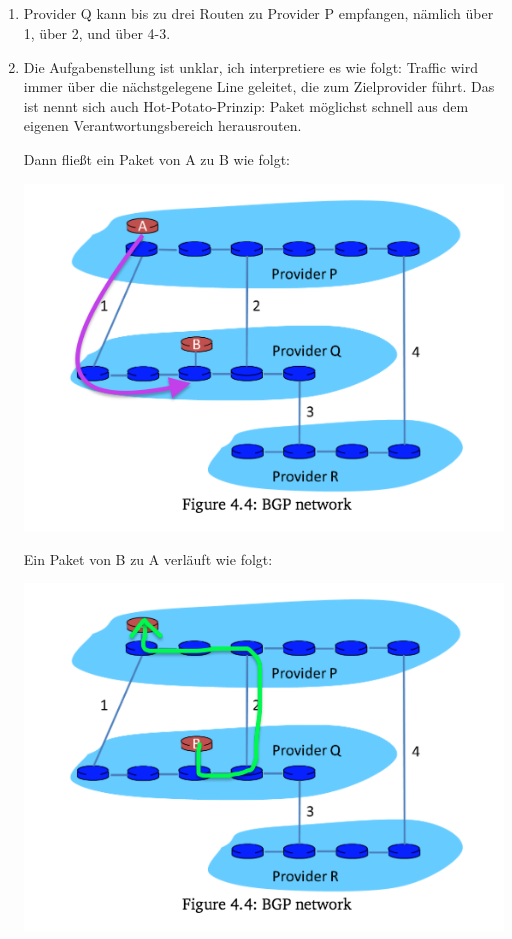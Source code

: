 \documentclass[a4paper,
			llpt,
			solution,
			accentcolor=tud2d,
			colorbacktitle
			]
			{tudexercise}
\newcommand{\8}{$\infty$}
\begin{document}
\subsection{}
\begin{enumerate}
\item Provider Q kann bis zu drei Routen zu Provider P empfangen, nämlich über 1, über 2, und über 4-3.
\item Die Aufgabenstellung ist unklar, ich interpretiere es wie folgt: Traffic wird immer über die nächstgelegene Line geleitet, die zum Zielprovider führt. Das ist nennt sich auch Hot-Potato-Prinzip: Paket möglichst schnell aus dem eigenen Verantwortungsbereich herausrouten.

\begin{multicols}{2}
Dann fließt ein Paket von A zu B wie folgt:

\includegraphics[scale=0.4]{4_3_1_b_AB.png}

Ein Paket von B zu A verläuft wie folgt:

\includegraphics[scale=0.4]{4_3_1_b_BA.png}
\end{multicols}
\end{enumerate}
\end{document}
